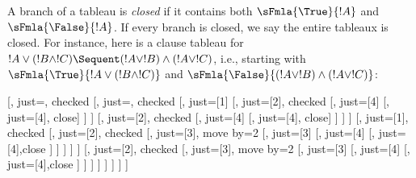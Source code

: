 \documentclass[../../../include/open-logic-section]{subfiles}
\begin{document}
A branch of a tableau is \emph{closed} if it contains both
$\sFmla{\True}{!A}$ and $\sFmla{\False}{!A}$. If every branch is
closed, we say the entire tableaux is closed. For instance, here is a
clause tableau for $!A \lor (!B \land !C) \Sequent (!A \lor !B) \land
(!A \lor !C)$, i.e., starting with $\sFmla{\True}{!A \lor (!B \land
!C)}$ and $\sFmla{\False}{(!A \lor !B) \land (!A \lor !C)}$:
\begin{maxwidth}
  \begin{tableau}{}
  [,
    just=\TAss, checked
    [, just=\TAss, checked
      [, just={\TRule{\True}{\lor}[1]}
        [,
          just={\TRule{\False}{\land}[2]}, checked
          [,
            just={\TRule{\False}{\lor}[4]}
            [,
              just={\TRule{\False}{\lor}[4]}, close]
          ]
        ]
        [,
          just={\TRule{\False}{\land}[2]}, checked
          [,
            just={\TRule{\False}{\lor}[4]}
            [,
              just={\TRule{\False}{\lor}[4]}, close]
          ]
        ]
      ]
      [,
        just={\TRule{\True}{\lor}[1]}, checked
        [,
          just={\TRule{\False}{\land}[2]}, checked
          [,
            just={\TRule{\True}{\land}[3]}, move by=2
            [,
              just={\TRule{\True}{\land}[3]}
              [,
                just={\TRule{\False}{\lor}[4]}
                [,
                  just={\TRule{\False}{\lor}[4]},close
                ]
              ]
            ]
          ]
        ]
        [,
          just={\TRule{\False}{\land}[2]}, checked
          [,
            just={\TRule{\True}{\land}[3]}, move by=2
              [,
                just={\TRule{\True}{\land}[3]}
                [,
                  just={\TRule{\False}{\lor}[4]}
                  [,
                  just={\TRule{\False}{\lor}[4]},close
                ]
              ]
            ]
          ]
        ]
      ]
    ]
  ]
\end{tableau}
\end{maxwidth}
\end{document}
